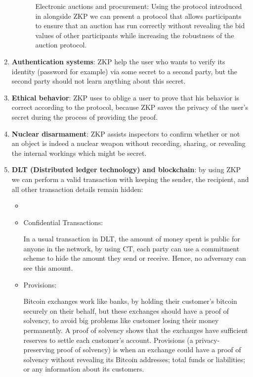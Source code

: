 \documentclass[10pt,a4paper]{article}
\begin{document}
\begin{enumerate}
\begin{enumerate}
\begin{itemize}
				Electronic auctions and procurement:
				Using the protocol introduced in  \cite{palmer2010protocol:18} alongside  ZKP we can present a protocol that allows participants to ensure that an auction has run correctly without revealing the bid values of other participants while increasing the robustness of the auction protocol.
			\end{itemize}
		\end{enumerate}
		\item
		\begin{enumerate}
			\textbf{Authentication systems}: ZKP help the user who wants to verify its identity (password for example) via some secret to a second party, but the second party should not learn anything about this secret.\cite{zk}
		\end{enumerate}	
		\item
		\begin{enumerate}
			\textbf{Ethical behavior}:  ZKP uses to oblige a user to prove that his behavior is correct according to the protocol, because ZKP saves the privacy of the user’s secret during the process of providing the proof.\cite{zknowledge:13}
		\end{enumerate}	
		\item
		\begin{enumerate}
			\textbf{Nuclear disarmament}: ZKP assists inspectors to confirm whether or not an object is indeed a nuclear weapon without recording, sharing, or revealing the internal workings which might be secret.\cite{zknowledge:13}
		\end{enumerate}	
		\item
		\begin{enumerate}
			\textbf{DLT (Distributed ledger technology) and blockchain}: by using ZKP we can perform a valid transaction with keeping the sender, the recipient, and all other transaction details remain hidden:
			\begin{itemize}
				\item
				\item
				Confidential Transactions:
				
				In a usual transaction in DLT, the amount of money spent is public for anyone in the network, by using CT, each party can use a commitment scheme to hide the amount they send or receive. Hence, no adversary can see this amount.
				\item
				Provisions:
				
				Bitcoin exchanges work like banks, by holding their customer's bitcoin securely on their behalf, but these exchanges should have a proof of solvency, to avoid big problems like customer losing their money permanently. 
				A proof of solvency shows that the exchanges have sufficient reserves to settle each customer's account.
				Provisions (a privacy-preserving proof of solvency) is when an exchange could have a proof of solvency without revealing its Bitcoin addresses; total funds or liabilities; or any information about its customers.
			\end{itemize}
		\end{enumerate}	
	\end{enumerate}	
\end{document}
